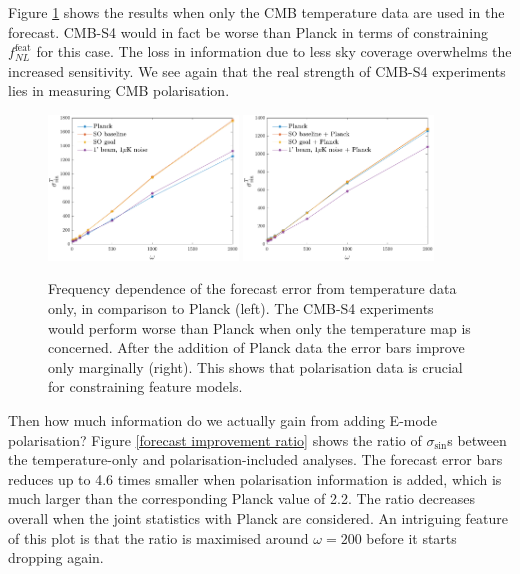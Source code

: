 Figure \ref{forecast omega dependence T} shows the results when only the CMB temperature data are used in the forecast. CMB-S4 would in fact be worse than Planck in terms of constraining $f_{NL}^\text{feat}$ for this case. The loss in information due to less sky coverage overwhelms the increased sensitivity. We see again that the real strength of CMB-S4 experiments lies in measuring CMB polarisation.

\begin{figure}[ht]
	\centering
	\includegraphics[width=0.45\textwidth]{omega_dependence_T.pdf}
	\includegraphics[width=0.45\textwidth]{omega_dependence_combined_T.pdf}
	\caption{Frequency dependence of the forecast error from temperature data only, in comparison to Planck (left). The CMB-S4 experiments would perform worse than Planck when only the temperature map is concerned. After the addition of Planck data the error bars improve only marginally (right). This shows that polarisation data is crucial for constraining feature models.}
	\label{forecast omega dependence T}
\end{figure}

Then how much information do we actually gain from adding E-mode polarisation? Figure \ref{forecast improvement ratio} shows the ratio of $\sigma_{\sin}$s between the temperature-only and polarisation-included analyses. The forecast error bars reduces up to 4.6 times smaller when polarisation information is added, which is much larger than the corresponding Planck value of 2.2. The ratio decreases overall when the joint statistics with Planck are considered. An intriguing feature of this plot is that the ratio is maximised around $\omega=200$ before it starts dropping again.

